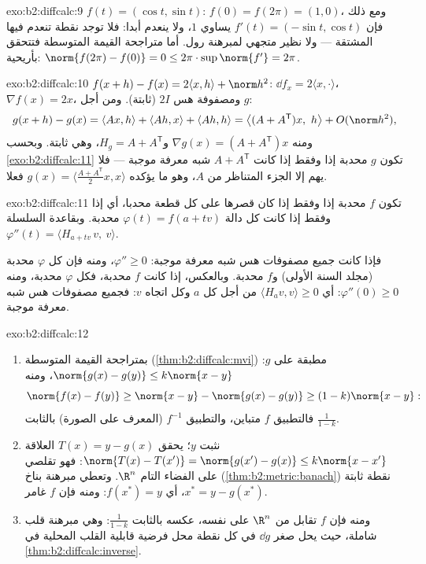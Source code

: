 \begin{solution}{exo:b2:diffcalc:9}
$f(t) = (\cos t, \sin t)$: $f(0) = f(2\pi) = (1, 0)$، ومع ذلك فإن  $f'(t) =
(-\sin t, \cos t)$ يساوي $1$، ولا ينعدم
أبدا: فلا توجد نقطة تنعدم فيها المشتقة --- ولا نظير متجهي لمبرهنة
رول. أما متراجحة القيمة المتوسطة فتتحقق بأريحية: $\norm{f(2\pi) - f(0)} = 0 \leq
2\pi \cdot \sup\norm{f'} = 2\pi$.
\end{solution}

\begin{solution}{exo:b2:diffcalc:10}
$f(x+h) - f(x) = 2\langle x, h\rangle + \norm h^2$: $\dd f_x =
2\langle x, \cdot\rangle$، $\nabla f(x) = 2x$، ومصفوفة هس $2I$ (ثابتة). ومن أجل $g$:
\[
g(x + h) - g(x) = \langle Ax, h\rangle + \langle Ah, x\rangle
+ \langle Ah, h\rangle
= \bigl\langle (A + A^{\mathsf T})x,\ h\bigr\rangle +
O(\norm h^2),
\]
ومنه $\nabla g(x) = (A + A^{\mathsf T})x$ و$H_g = A +
A^{\mathsf T}$، وهي ثابتة. وبحسب \cref{exo:b2:diffcalc:11} تكون $g$ محدبة إذا
وفقط إذا كانت $A + A^{\mathsf T}$ شبه معرفة موجبة --- فلا يهم إلا الجزء المتناظر
من $A$، وهو ما يؤكده $g(x) =
\langle \frac{A + A^{\mathsf T}}2 x, x\rangle$ فعلا.
\end{solution}

\begin{solution}{exo:b2:diffcalc:11}
تكون $f$ محدبة إذا وفقط إذا كان قصرها على كل قطعة محدبا، أي إذا
وفقط إذا كانت كل دالة $\varphi(t) = f(a + tv)$ محدبة. وبقاعدة السلسلة $\varphi''(t) = \langle H_{a+tv}\,v,\ v\rangle$.

فإذا كانت جميع مصفوفات هس شبه معرفة موجبة: $\varphi'' \geq 0$، ومنه فإن كل
$\varphi$ محدبة (مجلد السنة الأولى) و$f$ محدبة.
وبالعكس، إذا كانت $f$ محدبة، فكل $\varphi$ محدبة، ومنه
$\varphi''(0) \geq 0$: أي $\langle H_a v, v\rangle \geq 0$ من أجل كل $a$ وكل اتجاه $v$: فجميع مصفوفات
هس شبه معرفة موجبة.
\end{solution}

\begin{solution}{exo:b2:diffcalc:12}
\begin{enumerate}
  \item بمتراجحة القيمة المتوسطة
        (\cref{thm:b2:diffcalc:mvi}) مطبقة على $g$:
        $\norm{g(x) - g(y)} \leq k\norm{x-y}$، ومنه
        \[
        \norm{f(x) - f(y)} \geq \norm{x - y} - \norm{g(x) -
        g(y)} \geq (1 - k)\norm{x - y} :
        \]
        فالتطبيق $f$ متباين، والتطبيق $f^{-1}$ (المعرف على الصورة)
         بالثابت $\frac{1}{1-k}$.
  \item نثبت $y$؛ يحقق $T(x) = y - g(x)$ العلاقة $\norm{T(x) -
        T(x')} = \norm{g(x') - g(x)} \leq k\norm{x - x'}$: فهو تقلصي على
        الفضاء التام $\R^n$. وتعطي مبرهنة بناخ
        (\cref{thm:b2:metric:banach}) نقطة ثابتة $x^*
        = y - g(x^*)$، أي $f(x^*) = y$: ومنه فإن $f$ غامر.
  \item ومنه فإن $f$ تقابل من $\R^n$ على نفسه، عكسه 
        بالثابت $\frac{1}{1-k}$: وهي مبرهنة قلب شاملة، حيث يحل صغر $\dd g$ في
        كل نقطة محل فرضية قابلية القلب المحلية في
        \cref{thm:b2:diffcalc:inverse}.
\end{enumerate}
\end{solution}

